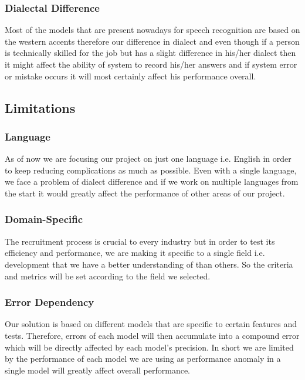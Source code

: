 \subsubsection{Dialectal Difference}
Most of the models that are present nowadays for speech recognition are based on the western accents therefore our difference in dialect and even though if a person is technically skilled for the job but has a slight difference in his/her dialect then it might affect the ability of system to record his/her answers and if system error or mistake occurs it will most certainly affect his performance overall.

\subsection{Limitations}
\subsubsection{Language}
As of now we are focusing our project on just one language i.e. English in order to keep reducing complications as much as possible. Even with a single language, we face a problem of dialect difference and if we work on multiple languages from the start it would greatly affect the performance of other areas of our project.

\subsubsection{Domain-Specific}
The recruitment process is crucial to every industry but in order to test its efficiency and performance, we are making it specific to a single field i.e. development that we have a better understanding of than others. So the criteria and metrics will be set according to the field we selected. 

\subsubsection{Error Dependency}
Our solution is based on different models that are specific to certain features and tests. Therefore, errors of each model will then accumulate into a compound error which will be directly affected by each model’s precision. In short we are limited by the performance of each model we are using as performance anomaly in a single model will greatly affect overall performance.

